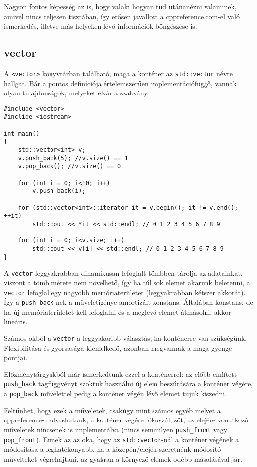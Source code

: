 \documentclass[a4paper,11.5pt]{article}
\begin{document}
	\begin{note}
		Nagyon fontos képesség az is, hogy valaki hogyan tud utánanézni valaminek, amivel nincs teljesen tisztában, így erősen javallott a \url{cppreference.com}-el való ismerkedés, illetve más helyeken lévő információk böngészése is.
	\end{note}	
	\subsection{vector}
	A \texttt{<vector>} könyvtárban található, maga a konténer az \texttt{std::vector} névre hallgat. Bár a pontos definíciója értelemszerűen implementációfüggő, vannak olyan tulajdonságok, melyeket elvár a szabvány.
	\smallskip
	\begin{lstlisting}
#include <vector>
#inclide <iostream>

int main()
{
	std::vector<int> v;
	v.push_back(5); //v.size() == 1
	v.pop_back(); //v.size() == 0
	
	for (int i = 0; i<10; i++)
		v.push_back(i);
		
	for (std::vector<int>::iterator it = v.begin(); it != v.end(); ++it)
		std::cout << *it << std::endl; // 0 1 2 3 4 5 6 7 8 9
		
	for (int i = 0; i<v.size; i++)
		std::cout << v[i] << std::endl; // 0 1 2 3 4 5 6 7 8 9
}
	\end{lstlisting}
	A \texttt{vector} leggyakrabban dinamikusan lefoglalt tömbben tárolja az adatainkat, viszont a tömb mérete nem növelhető, így ha túl sok elemet akarunk beletenni, a \texttt{vector} lefoglal egy nagyobb memóriaterületet (leggyakrabban kétszer akkorát). Így a \texttt{push\_back}-nek a műveletigénye amortizált konstans: Általában konstans, de ha új memóriaterületet kell lefoglalni és a meglevő elemet átmásolni, akkor lineáris.
	
	\begin{note}
		Számos okból a \texttt{vector} a leggyakoribb választás, ha konténerre van szükségünk. Flexibilitása és gyorsasága kiemelkedő, azonban megvannak a maga gyenge pontjai.
	\end{note}
	
	\smallskip
	Előzménytárgyakból már ismerkedtünk ezzel a konténerrel: az előbb említett \texttt{push\_back} tagfüggvényt szoktuk használni új elem beszúrására a konténer végére, a \texttt{pop\_back} művelettel pedig a konténer végén lévő elemet tujuk kiszedni. 
	
	Feltűnhet, hogy ezek a műveletek, csakúgy mint számos egyéb melyet a cppreference-n olvashatunk, a konténer végére fókuszál, sőt, az elejére vonatkozó műveletek nincsenek is implementálva (nincs semmilyen \texttt{push\_front} vagy \texttt{pop\_front}). Ennek az az oka, hogy az \texttt{std::vector}-nál a konténer végének a módosítása a leghatékonyabb, ha a közepén/elején szeretnénk módosító művelteket végrehajtani, az gyakran a környező elemek odébb másolásával jár.
\end{document}
